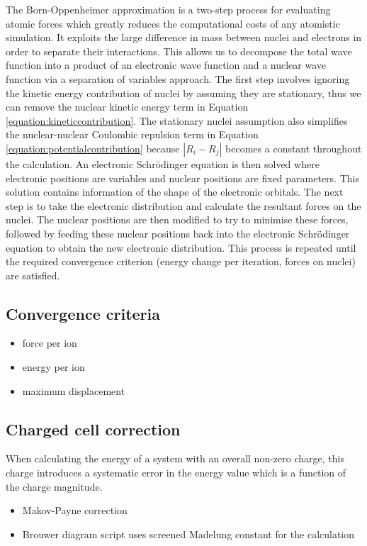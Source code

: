 The Born-Oppenheimer approximation is a two-step process for evaluating atomic forces which greatly reduces the computational costs of any atomistic simulation. It exploits the large difference in mass between nuclei and electrons in order to separate their interactions. This allows us to decompose the total wave function into a product of an electronic wave function and a nuclear wave function via a separation of variables approach. The first step involves ignoring the kinetic energy contribution of nuclei by assuming they are stationary, thus we can remove the nuclear kinetic energy term in Equation \ref{equation:kineticcontribution}. The stationary nuclei assumption also simplifies the nuclear-nuclear Coulombic repulsion term in Equation \ref{equation:potentialcontribution} because $|R_i - R_j|$ becomes a constant throughout the calculation. An electronic Schr\"{o}dinger equation is then solved where electronic positions are variables and nuclear positions are fixed parameters. This solution contains information of the shape of the electronic orbitals. The next step is to take the electronic distribution and calculate the resultant forces on the nuclei. The nuclear positions are then modified to try to minimise these forces, followed by feeding these nuclear positions back into the electronic Schr\"{o}dinger equation to obtain the new electronic distribution. This process is repeated until the required convergence criterion (energy change per iteration, forces on nuclei) are satisfied.

\subsection{Convergence criteria}

\begin{itemize}
\item force per ion
\item energy per ion
\item maximum displacement
\end{itemize}


\subsection{Charged cell correction}

When calculating the energy of a system with an overall non-zero charge, this charge introduces a systematic error in the energy value which is a function of the charge magnitude. 

\begin{itemize}
\item Makov-Payne correction



\item Brouwer diagram script uses screened Madelung constant for the calculation
\end{itemize}

